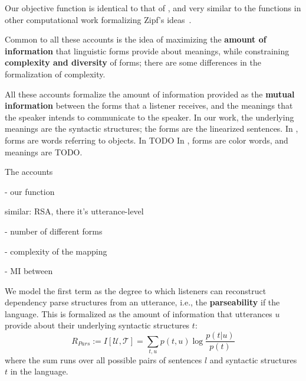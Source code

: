 \documentclass[10pt,twoside,lineno]{article}
\newcommand{\key}[1]{\textbf{#1}}
\begin{document}
Our objective function is identical to that of \cite{ferreri2003least}, and very similar to the functions in other computational work formalizing Zipf's ideas~\cite{ferreri2003least,frank2012predicting,zaslavsky2018efficient,kemp2012kinship,regier2015word,goodman2013knowledge}.


Common to all these accounts is the idea of maximizing the \key{amount of information} that linguistic forms provide about meanings, while constraining \key{complexity and diversity} of forms; there are some differences in the formalization of complexity.

All these accounts formalize the amount of information provided as the \key{mutual information} between the forms that a listener receives, and the meanings that the speaker intends to communicate to the speaker.
In our work, the underlying meanings are the syntactic structures; the forms are the linearized sentences.
In \cite{ferreri2003least, kemp2012kinship}, forms are words referring to objects.
In \cite{regier2015word} TODO
In \cite{zaslavsky2018efficient}, forms are color words, and meanings are TODO.


The accounts 

- our function



similar: RSA, there it's utterance-level

\cite{frank2012predicting,goodman2013knowledge}

- number of different forms 

- complexity of the mapping \cite{kemp2012kinship}

- MI between
\cite{zaslavsky2018efficient}


We model the first term as the 
 degree to which listeners can reconstruct dependency parse structures from an utterance, i.e., the \key{parseability} if the language. This is formalized as the amount of information that utterances $u$ provide about their underlying syntactic structures $t$:
\begin{equation}
	R_{Pars} := I[\mathcal{U},\mathcal{T}] = \sum_{t,u} p(t,u) \log \frac{p(t|u)}{p(t)}
\end{equation}
where the sum runs over all possible pairs of sentences $l$ and syntactic structures $t$ in the language.
\end{document}
